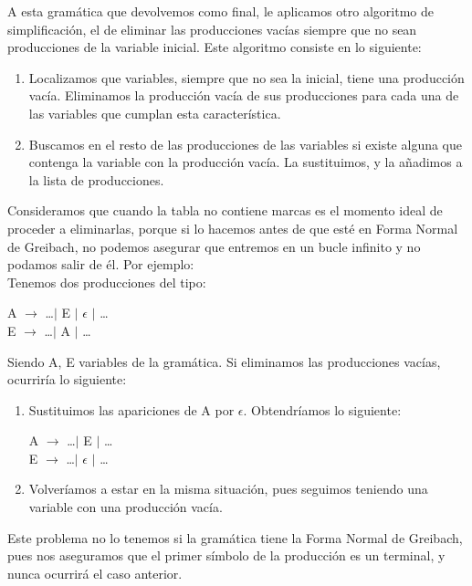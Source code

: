 \documentclass[12pt,a4paper,spanish]{book}
\begin{document}
A esta gram\'atica que devolvemos como final, le aplicamos otro algoritmo de simplificaci\'on, el de eliminar las producciones vac\'ias siempre que no sean producciones de la variable inicial.
Este algoritmo consiste en lo siguiente:
\begin{enumerate}
\item Localizamos que variables, siempre que no sea la inicial, tiene una producci\'on vac\'ia. Eliminamos la producci\'on vac\'ia de sus producciones para cada una de las variables que cumplan esta caracter\'istica.
\item Buscamos en el resto de las producciones de las variables si existe alguna que contenga la variable con la producci\'on vac\'ia. La sustituimos, y la a\~nadimos a la lista de producciones.
\end{enumerate}
Consideramos que cuando la tabla no contiene marcas es el momento ideal de proceder a eliminarlas, porque si lo hacemos antes de que est\'e en Forma Normal de Greibach, no podemos asegurar que entremos en un bucle infinito y no podamos salir de \'el. Por ejemplo:\\
Tenemos dos producciones del tipo:\\
\begin{center}
A $\rightarrow$ \ldots $\mid$ E $\mid$ $\epsilon$ $\mid$ \ldots\\
E $\rightarrow$ \ldots $\mid$ A $\mid$ \ldots\\
\end{center}
Siendo A, E variables de la gram\'atica. Si eliminamos las producciones vac\'ias, ocurrir\'ia lo siguiente:\\
\begin{enumerate}	
\item Sustituimos  las apariciones de A por $\epsilon$. Obtendr\'iamos lo siguiente:\\
\begin{center}
	A $\rightarrow$ \ldots $\mid$ E $\mid$ \ldots\\
	E $\rightarrow$ \ldots $\mid$ $\epsilon$ $\mid$ \ldots\\
\end{center}
\item Volver\'iamos a estar en la misma situaci\'on, pues seguimos teniendo una variable con una producci\'on vac\'ia.
\end{enumerate}
Este problema no lo tenemos si la gram\'atica tiene la Forma Normal de Greibach, pues nos aseguramos que el primer s\'imbolo de la producci\'on es un terminal, y nunca ocurrir\'a el caso anterior.
\end{document}
